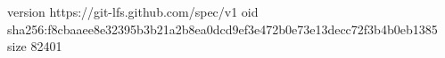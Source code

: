 version https://git-lfs.github.com/spec/v1
oid sha256:f8cbaaee8e32395b3b21a2b8ea0dcd9ef3e472b0e73e13decc72f3b4b0eb1385
size 82401
